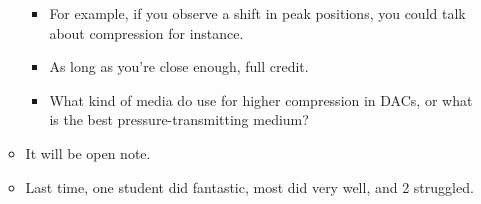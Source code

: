 \documentclass[../notes.tex]{subfiles}
\begin{document}
\begin{itemize}
\begin{itemize}
        \begin{itemize}
            \item For example, if you observe a shift in peak positions, you could talk about compression for instance.
            \item As long as you're close enough, full credit.
            \item What kind of media do use for higher compression in DACs, or what is the best pressure-transmitting medium?
        \end{itemize}
        \item It will be open note.
        \item Last time, one student did fantastic, most did very well, and 2 struggled.
    \end{itemize}
\end{itemize}
\end{document}
